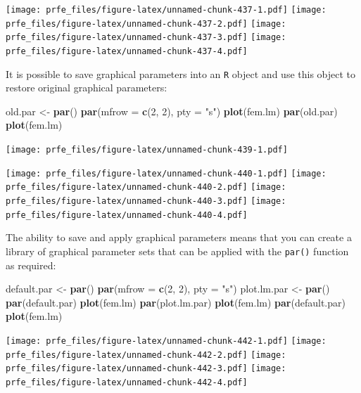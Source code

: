 \documentclass[12pt,a4paper]{book}
\newenvironment{Shaded}{\begin{snugshade}}{\end{snugshade}}
\newcommand{\KeywordTok}[1]{\textcolor[rgb]{0.13,0.29,0.53}{\textbf{#1}}}
\newcommand{\DataTypeTok}[1]{\textcolor[rgb]{0.13,0.29,0.53}{#1}}
\newcommand{\DecValTok}[1]{\textcolor[rgb]{0.00,0.00,0.81}{#1}}
\newcommand{\StringTok}[1]{\textcolor[rgb]{0.31,0.60,0.02}{#1}}
\newcommand{\NormalTok}[1]{#1}
\theoremstyle{definition}
\theoremstyle{definition}
\theoremstyle{definition}
\theoremstyle{remark}
\begin{document}
\texttt{[image: prfe\_files/figure-latex/unnamed-chunk-437-1.pdf]}
\texttt{[image: prfe\_files/figure-latex/unnamed-chunk-437-2.pdf]}
\texttt{[image: prfe\_files/figure-latex/unnamed-chunk-437-3.pdf]}
\texttt{[image: prfe\_files/figure-latex/unnamed-chunk-437-4.pdf]}

It is possible to save graphical parameters into an \texttt{R} object
and use this object to restore original graphical parameters:

\begin{Shaded}
\begin{Highlighting}[]
\NormalTok{old.par <-}\StringTok{ }\KeywordTok{par}\NormalTok{()}
\KeywordTok{par}\NormalTok{(}\DataTypeTok{mfrow =} \KeywordTok{c}\NormalTok{(}\DecValTok{2}\NormalTok{, }\DecValTok{2}\NormalTok{), }\DataTypeTok{pty =} \StringTok{"s"}\NormalTok{)}
\KeywordTok{plot}\NormalTok{(fem.lm)}
\KeywordTok{par}\NormalTok{(old.par)}
\KeywordTok{plot}\NormalTok{(fem.lm)}
\end{Highlighting}
\end{Shaded}

\texttt{[image: prfe\_files/figure-latex/unnamed-chunk-439-1.pdf]}

\texttt{[image: prfe\_files/figure-latex/unnamed-chunk-440-1.pdf]}
\texttt{[image: prfe\_files/figure-latex/unnamed-chunk-440-2.pdf]}
\texttt{[image: prfe\_files/figure-latex/unnamed-chunk-440-3.pdf]}
\texttt{[image: prfe\_files/figure-latex/unnamed-chunk-440-4.pdf]}

The ability to save and apply graphical parameters means that you can
create a library of graphical parameter sets that can be applied with
the \texttt{par()} function as required:

\begin{Shaded}
\begin{Highlighting}[]
\NormalTok{default.par <-}\StringTok{ }\KeywordTok{par}\NormalTok{()}
\KeywordTok{par}\NormalTok{(}\DataTypeTok{mfrow =} \KeywordTok{c}\NormalTok{(}\DecValTok{2}\NormalTok{, }\DecValTok{2}\NormalTok{), }\DataTypeTok{pty =} \StringTok{"s"}\NormalTok{)}
\NormalTok{plot.lm.par <-}\StringTok{ }\KeywordTok{par}\NormalTok{()}
\KeywordTok{par}\NormalTok{(default.par)}
\KeywordTok{plot}\NormalTok{(fem.lm)}
\KeywordTok{par}\NormalTok{(plot.lm.par)}
\KeywordTok{plot}\NormalTok{(fem.lm)}
\KeywordTok{par}\NormalTok{(default.par)}
\KeywordTok{plot}\NormalTok{(fem.lm)}
\end{Highlighting}
\end{Shaded}

\texttt{[image: prfe\_files/figure-latex/unnamed-chunk-442-1.pdf]}
\texttt{[image: prfe\_files/figure-latex/unnamed-chunk-442-2.pdf]}
\texttt{[image: prfe\_files/figure-latex/unnamed-chunk-442-3.pdf]}
\texttt{[image: prfe\_files/figure-latex/unnamed-chunk-442-4.pdf]}
\end{document}
